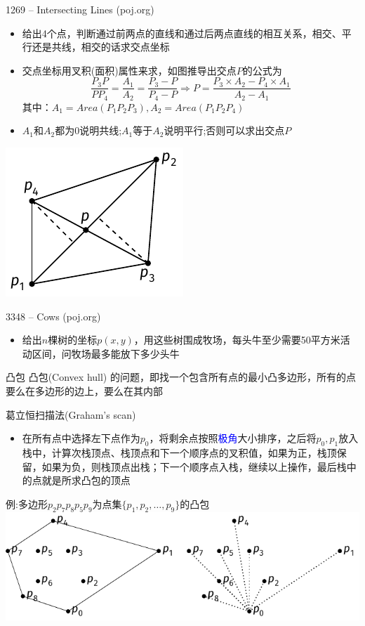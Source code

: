 \begin{frame}{1269 -- Intersecting Lines (poj.org)}
    \begin{itemize}
        \item 给出4个点，判断通过前两点的直线和通过后两点直线的相互关系，相交、平行还是共线，相交的话求交点坐标
        \item 交点坐标用叉积(面积)属性来求，如图推导出交点$P$的公式为
        $$\frac{P_3P}{PP_4}=\frac{A_1}{A_2}=\frac{P_3-P}{P_4-P}\Rightarrow P=\frac{P_3\times A_2-P_4\times A_1}{A_2-A_1}$$
        其中：$A_1=Area(P_1P_2P_3),A_2=Area(P_1P_2P_4)$
        \item $A_1$和$A_2$都为0说明共线;$A_1$等于$A_2$说明平行;否则可以求出交点$P$
    \end{itemize} 
    \includegraphics[center]{fig/9-6.pdf}
\end{frame}
\begin{frame}{3348 -- Cows (poj.org)}
    \begin{itemize}
        \item 给出$n$棵树的坐标$p(x,y)$，用这些树围成牧场，每头牛至少需要50平方米活动区间，问牧场最多能放下多少头牛
    \end{itemize} 
    \vfill
    \begin{block}{凸包}
        凸包(Convex hull) 的问题，即找一个包含所有点的最小凸多边形，所有的点要么在多边形的边上，要么在其内部
    \end{block}
\end{frame}
\begin{frame}{葛立恒扫描法(Graham's scan)}
    \begin{itemize}
        \item 在所有点中选择左下点作为$p_0$，将剩余点按照\textcolor{blue}{极角}大小排序，之后将$p_0,p_1$放入栈中，计算次栈顶点、栈顶点和下一个顺序点的叉积值，如果为正，栈顶保留，如果为负，则栈顶点出栈；下一个顺序点入栈，继续以上操作，最后栈中的点就是所求凸包的顶点
    \end{itemize}
    \begin{exampleblock}{例:多边形$p_2p_7p_8p_5p_9$为点集$\{ p_1,p_2,\ldots ,p_9\}$的凸包}
        \includegraphics{fig/9-7.pdf}
    \end{exampleblock}
\end{frame}
